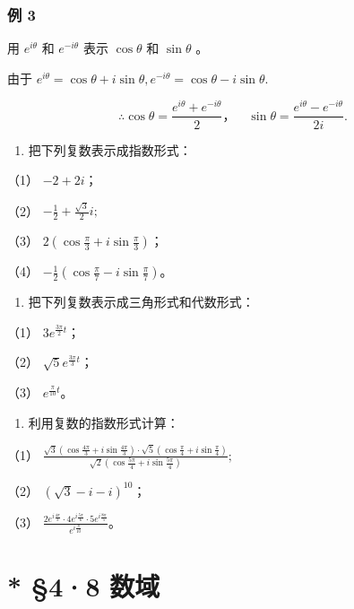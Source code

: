 \subsubsection{例 3}

用 \(e^{i\theta}\) 和 \(e^{-i\theta}\) 表示 \(\cos\theta\) 和
\(\sin\theta\) 。

 由于
\(e^{i\theta} = \cos \theta + i\sin \theta, e^{-i\theta} = \cos \theta - i\sin \theta.\)

\[
\therefore \cos \theta = \frac {e ^ {i \theta} + e ^ {- i \theta}}{2}\text{，} \quad \sin \theta = \frac {e ^ {i \theta} - e ^ {- i \theta}}{2 i}.
\]

\begin{enumerate}
\item
  把下列复数表示成指数形式：
\end{enumerate}

（1） \(-2 + 2i\)；

（2） \(-\frac{1}{2} + \frac{\sqrt{3}}{2} i;\)

（3） \(2\left(\cos \frac{\pi}{3} + i \sin \frac{\pi}{3}\right)\)；

（4）
\(-\frac{1}{2}\left(\cos \frac{\pi}{7} - i \sin \frac{\pi}{7}\right)\)。

\begin{enumerate}[start=2]
\item
  把下列复数表示成三角形式和代数形式：
\end{enumerate}

（1） \(3e^{\frac{3\pi}{2}t}\)；

（2） \(\sqrt{5} e^{\frac{3\pi}{3} t}\)；

（3） \(e^{\frac{\pi}{10} t}\)。

\begin{enumerate}[start=3]
\item
  利用复数的指数形式计算：
\end{enumerate}

（1）
\(\frac{\sqrt{3}\left(\cos\frac{4\pi}{3}+i\sin\frac{4\pi}{3}\right)\cdot\sqrt{5}\left(\cos\frac{\pi}{4}+i\sin\frac{\pi}{4}\right)}{\sqrt{2}\left(\cos\frac{5\pi}{4}+i\sin\frac{5\pi}{4}\right)};\)

（2） \((\sqrt{3} - i - i)^{10}\)；

（3）
\(\frac{2e^{i\frac{4\pi}{3}}\cdot 4e^{i\frac{5\pi}{6}}\cdot 5e^{i\frac{8\pi}{5}}}{e^{i\frac{\pi}{10}}}\)。

\section{* §4·8 数域}

